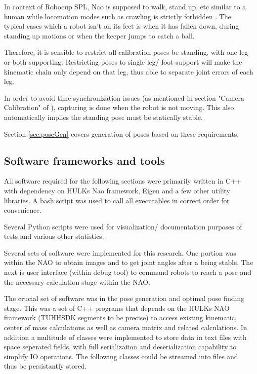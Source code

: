 \documentclass[english, printversion, nomenclature, notitle]{tuvisionthesis} %
\begin{document}
In context of Robocup SPL, Nao is supposed to walk, stand up, etc similar to a human while locomotion modes such as crawling is strictly forbidden \cite{robocup_technical_committee_robocup_2018}. The typical cases which a robot isn't on its feet is when it has fallen down, during standing up motions or when the keeper jumps to catch a ball.

Therefore, it is sensible to restrict all calibration poses be standing, with one leg or both supporting. Restricting poses to single leg/ foot support will make the kinematic chain only depend on that leg, thus able to separate joint errors of each leg.

In order to avoid time synchronization issues (as mentioned in section "Camera Calibration" of \cite{darshana_adikari_team_2017}), capturing is done when the robot is not moving. This also automatically implies the standing pose must be statically stable.

Section \ref{sec:poseGen} covers generation of poses based on these requirements.

\subsection{Software frameworks and tools}

All software required for the following sections were primarily written in C++ with dependency on HULKs Nao framework, Eigen and a few other utility libraries. A bash script was used to call all executables in correct order for convenience.

Several Python scripts were used for visualization/ documentation purposes of tests and various other statistics.


Several sets of software were implemented for this research. One portion was within the NAO to obtain images and to get joint angles after a being stable. The next is user interface (within debug tool) to command robots to reach a pose and the necessary calculation stage within the NAO.

The crucial set of software was in the pose generation and optimal pose finding stage. This was a set of C++ programs that depends on the HULKs NAO framework (TUHHSDK segments to be precise) to access existing kinematic, center of mass calculations as well as camera matrix and related calculations. In addition a multitude of classes were implemented to store data in text files with space seperated fields, with full serialization and deserialization capability to simplify IO operations. The following classes could be streamed into files and thus be persistantly stored.
\end{document}
